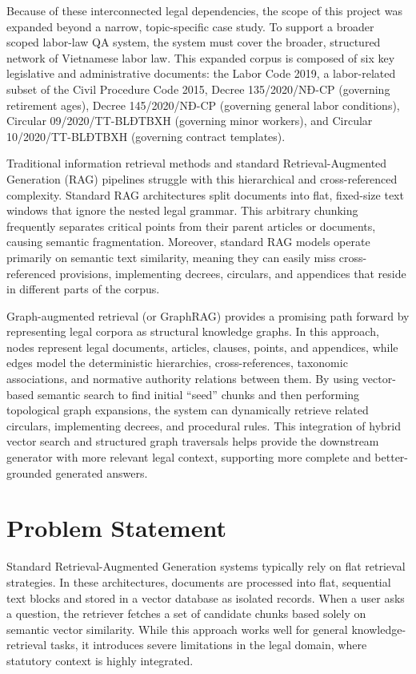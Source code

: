 Because of these interconnected legal dependencies, the scope of this project was expanded beyond a narrow, topic-specific case study. To support a broader scoped labor-law QA system, the system must cover the broader, structured network of Vietnamese labor law. This expanded corpus is composed of six key legislative and administrative documents: the Labor Code 2019, a labor-related subset of the Civil Procedure Code 2015, Decree 135/2020/NĐ-CP (governing retirement ages), Decree 145/2020/NĐ-CP (governing general labor conditions), Circular 09/2020/TT-BLĐTBXH (governing minor workers), and Circular 10/2020/TT-BLĐTBXH (governing contract templates).

Traditional information retrieval methods and standard Retrieval-Augmented Generation (RAG) pipelines \cite{lewis2020retrieval} struggle with this hierarchical and cross-referenced complexity. Standard RAG architectures split documents into flat, fixed-size text windows that ignore the nested legal grammar. This arbitrary chunking frequently separates critical points from their parent articles or documents, causing semantic fragmentation. Moreover, standard RAG models operate primarily on semantic text similarity, meaning they can easily miss cross-referenced provisions, implementing decrees, circulars, and appendices that reside in different parts of the corpus.

Graph-augmented retrieval (or GraphRAG) provides a promising path forward by representing legal corpora as structural knowledge graphs. In this approach, nodes represent legal documents, articles, clauses, points, and appendices, while edges model the deterministic hierarchies, cross-references, taxonomic associations, and normative authority relations between them. By using vector-based semantic search to find initial ``seed'' chunks and then performing topological graph expansions, the system can dynamically retrieve related circulars, implementing decrees, and procedural rules. This integration of hybrid vector search and structured graph traversals helps provide the downstream generator with more relevant legal context, supporting more complete and better-grounded generated answers.

\section{Problem Statement}
Standard Retrieval-Augmented Generation systems typically rely on flat retrieval strategies. In these architectures, documents are processed into flat, sequential text blocks and stored in a vector database as isolated records. When a user asks a question, the retriever fetches a set of candidate chunks based solely on semantic vector similarity. While this approach works well for general knowledge-retrieval tasks, it introduces severe limitations in the legal domain, where statutory context is highly integrated.

